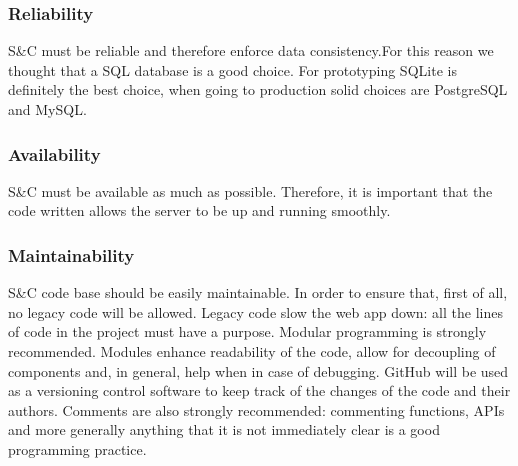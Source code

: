 \subsubsection{Reliability}
S\&C must be reliable and therefore enforce data consistency.For this reason we thought that a SQL database is a good choice. For prototyping SQLite is definitely the best choice, when going to production solid choices are PostgreSQL and MySQL.

\subsubsection{Availability}
S\&C must be available as much as possible. Therefore, it is important that the code written allows the server to be up and running smoothly.

\subsubsection{Maintainability}
S\&C code base should be easily maintainable. In order to ensure that, first of all, no legacy code will be allowed. Legacy code slow the web app down: all the lines of code in the project must have a purpose. Modular programming is strongly recommended. Modules enhance readability of the code, allow for decoupling of components and, in general, help when in case of debugging. GitHub will be used as a versioning control software to keep track of the changes of the code and their authors. Comments are also strongly recommended: commenting functions, APIs and more generally anything that it is not immediately clear is a good programming practice.